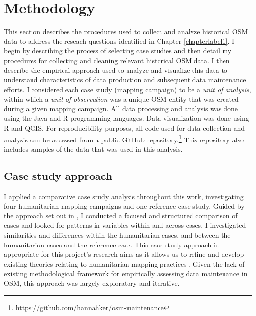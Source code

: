 \chapter{Methodology}
\label{chapterlabel4}

This section describes the procedures used to collect and analyze historical OSM data to address the reseach questions identified in Chapter \ref{chapterlabel1}. I begin by describing the process of selecting case studies and then detail my procedures for collecting and cleaning relevant historical OSM data. I then describe the empirical approach used to analyze and visualize this data to understand characteristics of data production and subsequent data maintenance efforts. I considered each case study (mapping campaign) to be a \textit{unit of analysis}, within which a \textit{unit of observation} was a unique OSM entity that was created during a given mapping campaign. All data processing and analysis was done using the Java and R programming languages. Data visualization was done using R and QGIS. For reproducibility purposes, all code used for data collection and analysis can be accessed from a public GitHub repository.\footnote{\url{https://github.com/hannahker/osm-maintenance}} This repository also includes samples of the data that was used in this analysis. 

\section{Case study approach}

I applied a comparative case study analysis throughout this work, investigating four humanitarian mapping campaigns and one reference case study. Guided by the approach set out in \textcite{kaarbo_practical_1999}, I conducted a focused and structured comparison of cases and looked for patterns in variables within and across cases. I investigated similarities and differences within the humanitarian cases, and between the humanitarian cases and the reference case. This case study approach is appropriate for this project's research aims as it allows us to refine and develop existing theories relating to humanitarian mapping practices \parencite{kaarbo_practical_1999}. Given the lack of existing methodological framework for empirically assessing data maintenance in OSM, this approach was largely exploratory and iterative.

